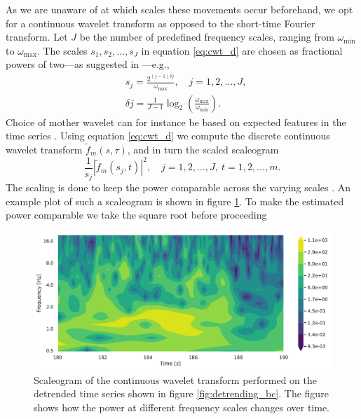 \documentclass[a4paper, 10pt]{memoir}
\theoremstyle{plain}
\theoremstyle{definition}
\theoremstyle{remark}
\begin{document}
As we are unaware of at which scales these movements occur beforehand, we opt for a continuous wavelet transform as opposed to the short-time Fourier transform.
Let $J$ be the number of predefined frequency scales, ranging from $\omega_{\text{min}}$ to $\omega_{\text{max}}$.
The scales $s_1, s_2, \hdots, s_J$ in equation \eqref{eq:cwt_d} are chosen as fractional powers of two—as suggested in \cite{torrence}—e.g.,
\begin{align*}
        &s_j = \frac{2^{(j - 1)\delta j}}{\omega_{\text{max}}}, \quad j = 1, 2, \hdots, J, \\
        & \delta j = \frac{1}{J - 1} \log_2 \left( \frac{\omega_{\text{max}}}{\omega_{\text{min}}} \right).
\end{align*}
Choice of mother wavelet can for instance be based on expected features in the time series \cite{torrence}.
Using equation \eqref{eq:cwt_d} we compute the discrete continuous wavelet transform $\tilde{f}_m(s, \tau)$, and in turn the scaled scaleogram
\begin{equation}\label{eq:s_spec}
       \frac{1}{s_j} \left|\tilde{f}_m(s_j, t) \right|^2, \quad j = 1, 2, \hdots, J, \ t = 1, 2, \hdots, m.
\end{equation}
The scaling is done to keep the power comparable across the varying scales \cite{liu}.
An example plot of such a scaleogram is shown in figure \ref{fig:scaleogram_bc}.
To make the estimated power comparable we take the square root before proceeding 
\begin{figure}[tb]
        \centering
        \includegraphics[width=\linewidth]{./code/figures/scaleograms/scaleogram_animal_1_BackPitch.pdf}
        \caption{Scaleogram of the continuous wavelet transform performed on the detrended time series shown in figure \ref{fig:detrending_bc}.
        The figure shows how the power at different frequency scales changes over time.}
        \label{fig:scaleogram_bc}
\end{figure}
\end{document}
